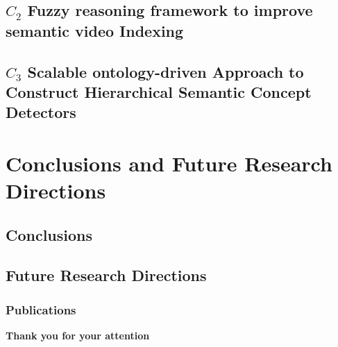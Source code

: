\documentclass{beamer}
\begin{document}
		\subsection[$C_{2}$ Fuzzy reasoning framework to improve semantic video Indexing]
				{$C_{2}$ Fuzzy reasoning framework to improve semantic video Indexing}
			
		\subsection[$C_{3}$ Scalable Ontology-Driven Approach for Concept Detector]
				{$C_{3}$ Scalable ontology-driven Approach to Construct Hierarchical Semantic Concept Detectors}
			

	\section{Conclusions and Future Research Directions}
		\subsection{Conclusions}
		
			
		\subsection{Future Research Directions}
		
			

		\begin{frame}[allowframebreaks]
			\renewcommand*{\bibfont}{\tiny}
			\frametitle{Publications}
				
    				
			\end{frame}
			

	\begin{frame}[plain]
  		\begin{center}\begin{huge}\textbf{\alert{Thank you for your attention}}\end{huge}\end{center}
	\end{frame}
\end{document}
